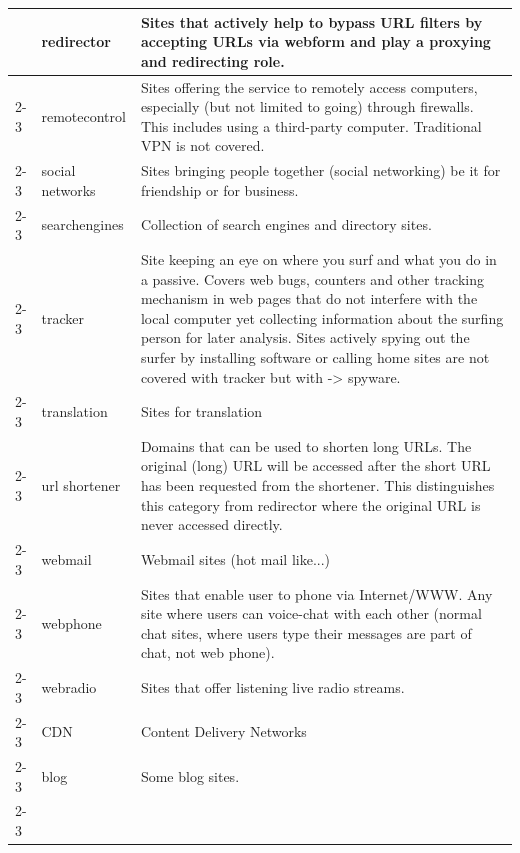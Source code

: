 \begin{longtable}{p{}|p{}|p{}}
                              & redirector & Sites that actively help to bypass URL filters by accepting URLs via webform and play a proxying and redirecting role. \\ \cline{2-3} 
                              & remotecontrol & Sites offering the service to remotely access computers, especially (but not limited to going) through firewalls. This includes using a third-party computer. Traditional VPN is not covered.\\ \cline{2-3} 
                              & social networks & Sites bringing people together (social networking) be it for friendship or for business.  \\ \cline{2-3}
                              & searchengines & Collection of search engines and directory sites.\\ \cline{2-3}
                              & tracker & Site keeping an eye on where you surf and what you do in a passive. Covers web bugs, counters and other tracking mechanism in web pages that do not interfere with the local computer yet collecting information about the surfing person for later analysis. Sites actively spying out the surfer by installing software or calling home sites are not covered with tracker but with -> spyware.\\ \cline{2-3} 
                              & translation & Sites for translation\\ \cline{2-3}
                              & url shortener & Domains that can be used to shorten long URLs. The original (long) URL will be accessed after the short URL has been requested from the shortener. This distinguishes this category from redirector where the original URL is never accessed directly.\\ \cline{2-3} 
                              & webmail & Webmail sites (hot mail like...)\\ \cline{2-3}
                              & webphone & Sites that enable user to phone via Internet/WWW. Any site where users can voice-chat with each other (normal chat sites, where users type their messages are part of chat, not web phone).\\ \cline{2-3}
                              & webradio & Sites that offer listening live radio streams.\\ \cline{2-3}
                              & CDN & Content Delivery Networks\\ \cline{2-3}
                              & blog & Some blog sites.\\ \cline{2-3}

\end{longtable}

